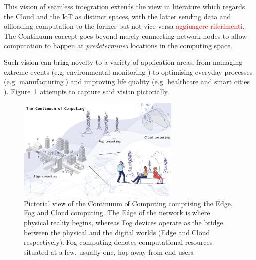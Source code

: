 This vision of seamless integration extends the view in literature which regards the Cloud and the IoT as distinct spaces, with the latter sending data and offloading computation to the former but not vice versa \textcolor{red}{aggiungere riferimenti}. The Continuum concept goes beyond merely connecting network nodes to allow computation to happen at \textit{predetermined} locations in the computing space.

Such vision can bring novelty to a variety of application areas, from managing extreme events (e.g. environmental monitoring \cite{brzoza2016embedded}) to optimising everyday processes (e.g. manufacturing \cite{chen2018edge}) and improving life quality (e.g. healthcare \cite{pace2018edge} and smart cities \cite{he2017multitier}).
Figure~\ref{fig:continuum} attempts to capture said vision pictorially. 
\begin{figure}[ht]
\centering
\includegraphics[width=0.7\textwidth]{figures/continuum}
\caption{Pictorial view of the Continuum of Computing comprising the Edge, Fog and Cloud computing. The Edge of the network is where physical reality begins, whereas Fog devices operate as the bridge between the physical and the digital worlds (Edge and Cloud respectively). Fog computing denotes computational resources situated at a few, usually one, hop away from end users.}
\label{fig:continuum}
\end{figure}


